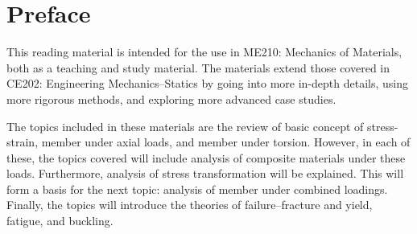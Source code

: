 \documentclass[
10pt,
a4paper,
openany,
svgnames,
]{book} %
\begin{document}
\frontmatter

\restoregeometry %
\nopagecolor%

\chapter*{Preface}

This reading material is intended for the use in ME210: Mechanics of Materials, both as a teaching and study material. The materials extend those covered in CE202: Engineering Mechanics--Statics by going into more in-depth details, using more rigorous methods, and exploring more advanced case studies.

The topics included in these materials are the review of basic concept of stress-strain, member under axial loads, and member under torsion. However, in each of these, the topics covered will include analysis of composite materials under these loads. Furthermore, analysis of stress transformation will be explained. This will form a basis for the next topic: analysis of member under combined loadings. Finally, the topics will introduce the theories of failure--fracture and yield, fatigue, and buckling.
\end{document}
